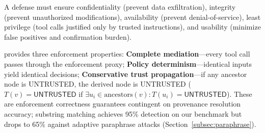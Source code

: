 A defense must ensure confidentiality (prevent data exfiltration), integrity (prevent unauthorized modifications), availability (prevent denial-of-service), least privilege (tool calls justified only by trusted instructions), and usability (minimize false positives and confirmation burden).

\sys{} provides three enforcement properties: \textbf{Complete mediation}---every tool call passes through the enforcement proxy; \textbf{Policy determinism}---identical inputs yield identical decisions; \textbf{Conservative trust propagation}---if any ancestor node is UNTRUSTED, the derived node is UNTRUSTED ($T(v) = \textsf{UNTRUSTED}$ if $\exists u_i \in \text{ancestors}(v): T(u_i) = \textsf{UNTRUSTED}$). These are enforcement correctness guarantees contingent on provenance resolution accuracy; substring matching achieves 95\% detection on our benchmark but drops to 65\% against adaptive paraphrase attacks (Section~\ref{subsec:paraphrase}).
